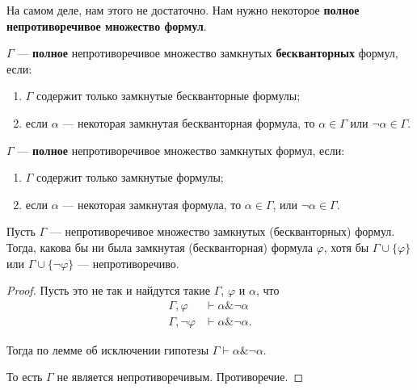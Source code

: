 На самом деле, нам этого не достаточно. Нам нужно некоторое \textbf{полное непротиворечивое множество формул}.
\begin{definition}
    $\Gamma$ --- \textbf{полное} непротиворечивое множество замкнутых \textbf{бескванторных} формул,
если:
\begin{enumerate}\item $\Gamma$ содержит только замкнутые бескванторные формулы;
\item если $\alpha$ --- некоторая замкнутая бескванторная формула, то $\alpha\in\Gamma$ или $\neg\alpha\in\Gamma$.
\end{enumerate}
\end{definition}

\begin{definition}
    $\Gamma$ --- \textbf{полное} непротиворечивое множество замкнутых формул, если:
\begin{enumerate}\item $\Gamma$ содержит только замкнутые формулы;
\item если $\alpha$ --- некоторая замкнутая формула, то $\alpha \in \Gamma$, или $\neg\alpha \in \Gamma$.
\end{enumerate}
\end{definition}

\begin{theorem}
    Пусть $\Gamma$ --- непротиворечивое множество замкнутых (бескванторных) формул. Тогда, какова бы ни была
замкнутая (бескванторная) формула $\varphi$, хотя бы $\Gamma \cup \{\varphi\}$ или $\Gamma \cup \{\neg\varphi\}$ ---
непротиворечиво.
\end{theorem}
\begin{proof}
    Пусть это не так и найдутся такие $\Gamma$, $\varphi$ и $\alpha$, что
 \[ \begin{array}{rl}\Gamma,\varphi & \vdash \alpha\&\neg\alpha\\
\Gamma,\neg\varphi & \vdash \alpha \&\neg\alpha. \end{array}\]

Тогда по лемме об исключении гипотезы $ \Gamma\vdash \alpha\&\neg\alpha. $

То есть $\Gamma$ не является непротиворечивым. Противоречие.
\end{proof}

